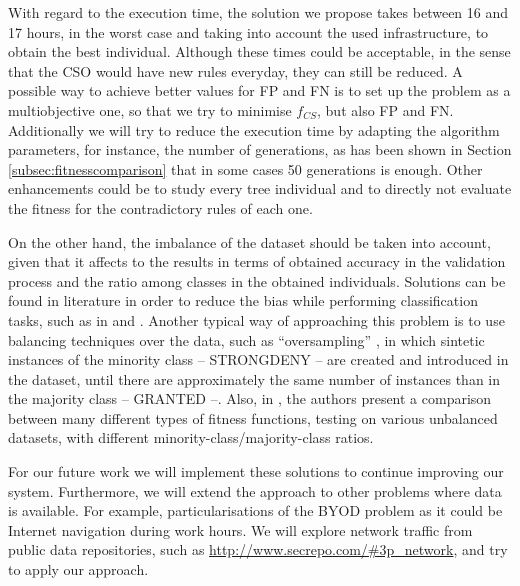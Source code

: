 \documentclass[runningheads]{llncs}
\begin{document}
With regard to the execution time, the solution we propose takes between 16 and 17 hours, in the worst case and taking into account the used infrastructure, to obtain the best individual. Although these times could be acceptable, in the sense that the CSO would have new rules everyday, they can still be reduced.  
A possible way to
achieve better values for FP and FN is to set up the problem as a
multiobjective one, so that we try to minimise $f_{CS}$, but also FP
and FN. Additionally we will try to reduce the execution time by adapting the algorithm parameters, for instance, the number of generations, as has been shown in Section \ref{subsec:fitnesscomparison} that in some cases 50 generations is enough. Other enhancements could be to study every tree individual and to directly not evaluate the fitness for the contradictory rules of each one. 

On the other hand, the imbalance of the dataset should be taken into
account, given that it affects to the results in terms of obtained
accuracy in the validation process and the ratio among classes in the
obtained individuals. Solutions can be found in literature in order to reduce the bias while performing classification
tasks, such as in \cite{chawla2005data} and \cite{sun2009classification}. Another typical way of approaching this problem is to
use balancing techniques over the data, such as ``oversampling'' \cite{smote_02}, in
which sintetic instances of the minority class -- STRONGDENY -- are
created and introduced in the dataset, until there are approximately
the same number of instances than in the majority class -- GRANTED
--. Also, in \cite{bhowan2012developing}, the authors present a comparison between many different types of
fitness functions, testing on various unbalanced datasets, with
different minority-class/majority-class ratios.

For our future work we will implement these solutions to continue
improving our system. Furthermore, we will extend the approach to other problems where data is available. For example, particularisations of the BYOD problem as it could be Internet navigation during work hours. We will explore network traffic from public data repositories, such as \url{http://www.secrepo.com/#3p\_network}, and try to apply our approach. 



      
   
\end{document}
